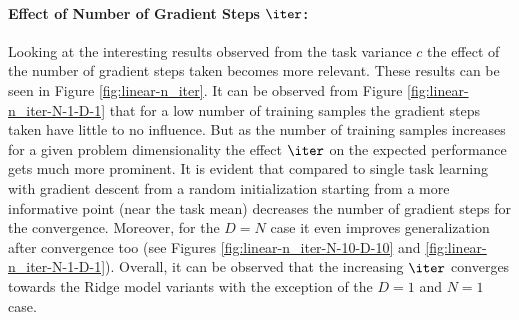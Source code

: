 \paragraph{Effect of Number of Gradient Steps $\iter$:} Looking at the interesting results observed from the task variance $c$  the effect of the number of gradient steps taken becomes more relevant. These results can be seen in Figure \ref{fig:linear-n_iter}. It can be observed from Figure \ref{fig:linear-n_iter-N-1-D-1} that for a low number of training samples the gradient steps taken have little to no influence. But as the number of training samples increases for a given problem dimensionality the effect $\iter$ on the expected performance gets much more prominent. It is evident that compared to single task learning with gradient descent from a random initialization starting from a more informative point (\eg near the task mean) decreases the number of gradient steps for the convergence. Moreover, for the $D=N$ case it even improves generalization after convergence too (see Figures \ref{fig:linear-n_iter-N-10-D-10} and \ref{fig:linear-n_iter-N-1-D-1}). Overall, it can be observed that the increasing $\iter$ converges towards the Ridge model variants with the exception of the $D=1$ and $N=1$ case.
 
